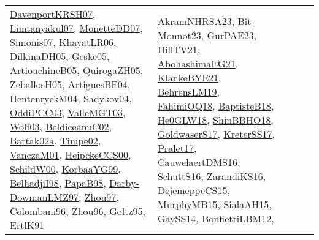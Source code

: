 {\begin{longtable}{lp{3cm}>{\raggedright}p{6cm}>{\raggedright}p{6cm}p{8cm}}
\href{papers/DavenportKRSH07.pdf}{DavenportKRSH07}\cite{DavenportKRSH07}, \href{papers/Limtanyakul07.pdf}{Limtanyakul07}\cite{Limtanyakul07}, \href{papers/MonetteDD07.pdf}{MonetteDD07}\cite{MonetteDD07}, \href{articles/Simonis07.pdf}{Simonis07}\cite{Simonis07}, \href{articles/KhayatLR06.pdf}{KhayatLR06}\cite{KhayatLR06}, \href{papers/DilkinaDH05.pdf}{DilkinaDH05}\cite{DilkinaDH05}, \href{papers/Geske05.pdf}{Geske05}\cite{Geske05}, \href{papers/ArtiouchineB05.pdf}{ArtiouchineB05}\cite{ArtiouchineB05}, \href{papers/QuirogaZH05.pdf}{QuirogaZH05}\cite{QuirogaZH05}, \href{articles/ZeballosH05.pdf}{ZeballosH05}\cite{ZeballosH05}, \href{papers/ArtiguesBF04.pdf}{ArtiguesBF04}\cite{ArtiguesBF04}, \href{papers/HentenryckM04.pdf}{HentenryckM04}\cite{HentenryckM04}, \href{papers/Sadykov04.pdf}{Sadykov04}\cite{Sadykov04}, \href{papers/OddiPCC03.pdf}{OddiPCC03}\cite{OddiPCC03}, \href{papers/ValleMGT03.pdf}{ValleMGT03}\cite{ValleMGT03}, \href{papers/Wolf03.pdf}{Wolf03}\cite{Wolf03}, \href{papers/BeldiceanuC02.pdf}{BeldiceanuC02}\cite{BeldiceanuC02}, \href{papers/Bartak02a.pdf}{Bartak02a}\cite{Bartak02a}, \href{articles/Timpe02.pdf}{Timpe02}\cite{Timpe02}, \href{papers/VanczaM01.pdf}{VanczaM01}\cite{VanczaM01}, \href{articles/HeipckeCCS00.pdf}{HeipckeCCS00}\cite{HeipckeCCS00}, \href{articles/SchildW00.pdf}{SchildW00}\cite{SchildW00}, \href{papers/KorbaaYG99.pdf}{KorbaaYG99}\cite{KorbaaYG99}, \href{articles/BelhadjiI98.pdf}{BelhadjiI98}\cite{BelhadjiI98}, \href{articles/PapaB98.pdf}{PapaB98}\cite{PapaB98}, \href{articles/Darby-DowmanLMZ97.pdf}{Darby-DowmanLMZ97}\cite{Darby-DowmanLMZ97}, \href{articles/Zhou97.pdf}{Zhou97}\cite{Zhou97}, \href{papers/Colombani96.pdf}{Colombani96}\cite{Colombani96}, \href{papers/Zhou96.pdf}{Zhou96}\cite{Zhou96}, \href{papers/Goltz95.pdf}{Goltz95}\cite{Goltz95}, \href{papers/ErtlK91.pdf}{ErtlK91}\cite{ErtlK91} & \href{articles/AkramNHRSA23.pdf}{AkramNHRSA23}\cite{AkramNHRSA23}, \href{papers/Bit-Monnot23.pdf}{Bit-Monnot23}\cite{Bit-Monnot23}, \href{articles/GurPAE23.pdf}{GurPAE23}\cite{GurPAE23}, \href{papers/HillTV21.pdf}{HillTV21}\cite{HillTV21}, \href{articles/AbohashimaEG21.pdf}{AbohashimaEG21}\cite{AbohashimaEG21}, \href{papers/KlankeBYE21.pdf}{KlankeBYE21}\cite{KlankeBYE21}, \href{papers/BehrensLM19.pdf}{BehrensLM19}\cite{BehrensLM19}, \href{articles/FahimiOQ18.pdf}{FahimiOQ18}\cite{FahimiOQ18}, \href{articles/BaptisteB18.pdf}{BaptisteB18}\cite{BaptisteB18}, \href{papers/He0GLW18.pdf}{He0GLW18}\cite{He0GLW18}, \href{articles/ShinBBHO18.pdf}{ShinBBHO18}\cite{ShinBBHO18}, \href{papers/GoldwaserS17.pdf}{GoldwaserS17}\cite{GoldwaserS17}, \href{articles/KreterSS17.pdf}{KreterSS17}\cite{KreterSS17}, \href{papers/Pralet17.pdf}{Pralet17}\cite{Pralet17}, \href{papers/CauwelaertDMS16.pdf}{CauwelaertDMS16}\cite{CauwelaertDMS16}, \href{papers/SchuttS16.pdf}{SchuttS16}\cite{SchuttS16}, \href{articles/ZarandiKS16.pdf}{ZarandiKS16}\cite{ZarandiKS16}, \href{papers/DejemeppeCS15.pdf}{DejemeppeCS15}\cite{DejemeppeCS15}, \href{papers/MurphyMB15.pdf}{MurphyMB15}\cite{MurphyMB15}, \href{papers/SialaAH15.pdf}{SialaAH15}\cite{SialaAH15}, \href{papers/GaySS14.pdf}{GaySS14}\cite{GaySS14}, \href{papers/BonfiettiLBM12.pdf}{BonfiettiLBM12}\cite{BonfiettiLBM12}, 
\end{longtable}}
